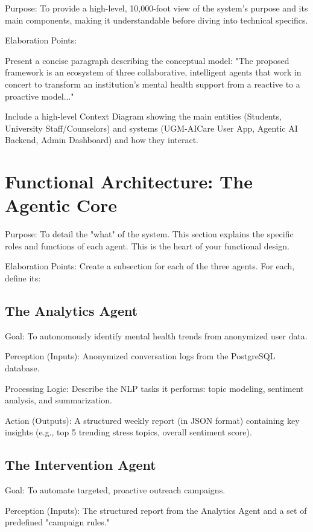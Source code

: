 Purpose: To provide a high-level, 10,000-foot view of the system's purpose and its main components, making it understandable before diving into technical specifics.

Elaboration Points:

Present a concise paragraph describing the conceptual model: "The proposed framework is an ecosystem of three collaborative, intelligent agents that work in concert to transform an institution's mental health support from a reactive to a proactive model..."

Include a high-level Context Diagram showing the main entities (Students, University Staff/Counselors) and systems (UGM-AICare User App, Agentic AI Backend, Admin Dashboard) and how they interact.

\section{Functional Architecture: The Agentic Core}
Purpose: To detail the "what" of the system. This section explains the specific roles and functions of each agent. This is the heart of your functional design.

Elaboration Points: Create a subsection for each of the three agents. For each, define its:

\subsection{The Analytics Agent}

Goal: To autonomously identify mental health trends from anonymized user data.

Perception (Inputs): Anonymized conversation logs from the PostgreSQL database.

Processing Logic: Describe the NLP tasks it performs: topic modeling, sentiment analysis, and summarization.

Action (Outputs): A structured weekly report (in JSON format) containing key insights (e.g., top 5 trending stress topics, overall sentiment score).

\subsection{The Intervention Agent}

Goal: To automate targeted, proactive outreach campaigns.

Perception (Inputs): The structured report from the Analytics Agent and a set of predefined "campaign rules."

